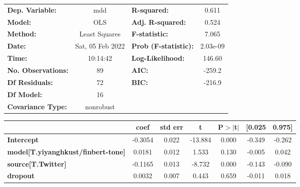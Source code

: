 \begin{center}
\begin{tabular}{lclc}
\toprule
\textbf{Dep. Variable:}                    &       mdd        & \textbf{  R-squared:         } &     0.611   \\
\textbf{Model:}                            &       OLS        & \textbf{  Adj. R-squared:    } &     0.524   \\
\textbf{Method:}                           &  Least Squares   & \textbf{  F-statistic:       } &     7.065   \\
\textbf{Date:}                             & Sat, 05 Feb 2022 & \textbf{  Prob (F-statistic):} &  2.03e-09   \\
\textbf{Time:}                             &     10:14:42     & \textbf{  Log-Likelihood:    } &    146.60   \\
\textbf{No. Observations:}                 &          89      & \textbf{  AIC:               } &    -259.2   \\
\textbf{Df Residuals:}                     &          72      & \textbf{  BIC:               } &    -216.9   \\
\textbf{Df Model:}                         &          16      & \textbf{                     } &             \\
\textbf{Covariance Type:}                  &    nonrobust     & \textbf{                     } &             \\
\bottomrule
\end{tabular}
\begin{tabular}{lcccccc}
                                           & \textbf{coef} & \textbf{std err} & \textbf{t} & \textbf{P$> |$t$|$} & \textbf{[0.025} & \textbf{0.975]}  \\
\midrule
\textbf{Intercept}                         &      -0.3054  &        0.022     &   -13.884  &         0.000        &       -0.349    &       -0.262     \\
\textbf{model[T.yiyanghkust/finbert-tone]} &       0.0181  &        0.012     &     1.533  &         0.130        &       -0.005    &        0.042     \\
\textbf{source[T.Twitter]}                 &      -0.1165  &        0.013     &    -8.732  &         0.000        &       -0.143    &       -0.090     \\
\textbf{dropout}                           &       0.0032  &        0.007     &     0.443  &         0.659        &       -0.011    &        0.018     \\

\end{tabular}
\end{center}
